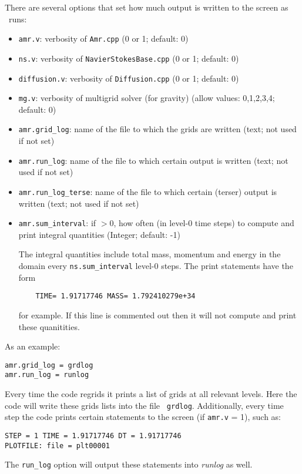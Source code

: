 There are several options that set how much output is written to the
screen as \pelelm\ runs:
\begin{itemize}
\item {\tt amr.v}: verbosity of {\tt Amr.cpp} (0 or 1; default: 0)

\item {\tt ns.v}: verbosity of {\tt NavierStokesBase.cpp} (0 or 1; default: 0)

\item {\tt diffusion.v}: verbosity of {\tt Diffusion.cpp} (0 or 1; default: 0)
  
\item {\tt mg.v}: verbosity of multigrid solver (for gravity) (allow
  values: 0,1,2,3,4; default: 0)
  
\item {\tt amr.grid\_log}: name of the file to which the grids are
  written (text; not used if not set)
  
\item {\tt amr.run\_log}: name of the file to which certain output is
  written (text; not used if not set)
  
\item {\tt amr.run\_log\_terse}: name of the file to which certain
  (terser) output is written (text; not used if not set)
  
\item {\tt amr.sum\_interval}: if $> 0$, how often (in level-0 time
  steps) to compute and print integral quantities (Integer; default: -1)

  The integral quantities include total mass, momentum and energy in
  the domain every {\tt ns.sum\_interval} level-0 steps.
  The print statements have the form
  \begin{verbatim}
    TIME= 1.91717746 MASS= 1.792410279e+34
  \end{verbatim}
  for example.  If this line is commented out then
  it will not compute and print these quanitities.

\end{itemize}

As an example:
\begin{lstlisting}
amr.grid_log = grdlog
amr.run_log = runlog 
\end{lstlisting}  
Every time the code regrids it prints a list of grids at all relevant
levels.  Here the code will write these grids lists into the file {\tt
  grdlog}.  Additionally, every time step the code prints certain
statements to the screen (if {\tt amr.v} = 1), such as:
\begin{verbatim}
STEP = 1 TIME = 1.91717746 DT = 1.91717746 
PLOTFILE: file = plt00001 
\end{verbatim}
The {\tt run\_log} option will output these statements into {\em
  runlog} as well.

